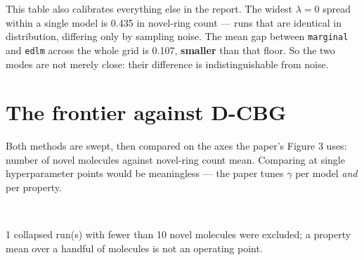\documentclass[11pt]{article}
\begin{document}
This table also calibrates everything else in the report. The widest $\lambda=0$
spread within a single model is 0.435 in novel-ring count --- runs that are
identical in distribution, differing only by sampling noise. The mean gap between
\texttt{marginal} and \texttt{edlm} across the whole grid is 0.107,
\textbf{smaller} than that floor. So the two
modes are not merely close: their difference is
indistinguishable from noise.

\section{The frontier against D-CBG}

Both methods are swept, then compared on the axes the paper's Figure 3 uses:
number of novel molecules against novel-ring count mean. Comparing at single
hyperparameter points would be meaningless --- the paper tunes $\gamma$ per model
\emph{and} per property.

\begin{table}[htbp]
\centering
\small
{}
\\[0.4em] \begin{minipage}{0.92\textwidth}\footnotesize 1 collapsed run(s) with fewer than 10 novel molecules were excluded; a property mean over a handful of molecules is not an operating point.\end{minipage}
\caption{MDLM: the Pareto-optimal settings of each method on (novel count, novel-ring count).}
\label{tab:frontier-ring_count-MDLM}
\end{table}
\end{document}
